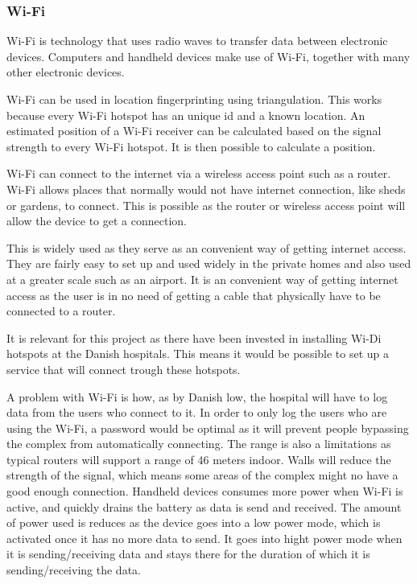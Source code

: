 \subsubsection{Wi-Fi} \label{wifitech}
Wi-Fi is  technology that uses radio waves to transfer data between electronic devices. Computers and handheld devices make use of Wi-Fi, together with many other electronic devices\cite{wifi_devices}.

Wi-Fi can be used in location fingerprinting using triangulation. This works because every Wi-Fi hotspot has an unique id and a known location. An estimated position of a Wi-Fi receiver can be calculated based on the signal strength to every Wi-Fi hotspot. It is then possible to calculate a position.\cite{Liu2007}

Wi-Fi can connect to the internet via a wireless access point such as a router. Wi-Fi allows places that normally would not have internet connection, like sheds or gardens, to connect. This is possible as the router or wireless access point will allow the device to get a connection.

This is widely used as they serve as an convenient way of getting internet access. They are fairly easy to set up and used widely in the private homes and also used at a greater scale such as an airport\cite{wifi_works}. It is an convenient way of getting internet access as the user is in no need of getting a cable that physically have to be connected to a router.

It is relevant for this project as there have been invested in installing Wi-Di hotspots at the Danish hospitals\cite{wifi_hospi}. This means it would be possible to set up a service that will connect trough these hotspots.

A problem with Wi-Fi is how, as by Danish low, the hospital will have to log data from the users who connect to it\cite{wifi_log}. In order to only log the users who are using the Wi-Fi, a password would be optimal as it will prevent people bypassing the complex from automatically connecting. The range is also a limitations as typical routers will support a range of 46 meters indoor\cite{wifi_range}. Walls will reduce the strength of the signal, which means some areas of the complex might no have a good enough connection\cite{wifi_wall}. Handheld devices consumes more power when Wi-Fi is active, and quickly drains the battery as data is send and received\cite{wifi_batt}. The amount of power used is reduces as the device goes into a low power mode, which is activated once it has no more data to send. It goes into hight power mode when it is sending/receiving data and stays there for the duration of which it is sending/receiving the data.
